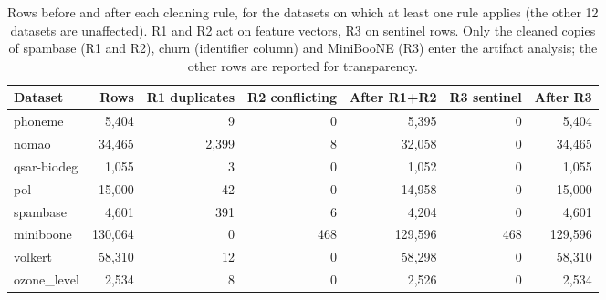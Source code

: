 \begin{table}[htbp]
\centering\small
\caption{Rows before and after each cleaning rule, for the datasets on which at least one rule applies (the other 12 datasets are unaffected). R1 and R2 act on feature vectors, R3 on sentinel rows. Only the cleaned copies of spambase (R1 and R2), churn (identifier column) and MiniBooNE (R3) enter the artifact analysis; the other rows are reported for transparency.}\label{tab:cleaning_counts}
\begin{tabular}{@{}lrrrrrr@{}}
\toprule
Dataset & Rows & R1 duplicates & R2 conflicting & After R1+R2 & R3 sentinel & After R3 \\
\midrule
phoneme & 5{,}404 & 9 & 0 & 5{,}395 & 0 & 5{,}404 \\
nomao & 34{,}465 & 2{,}399 & 8 & 32{,}058 & 0 & 34{,}465 \\
qsar-biodeg & 1{,}055 & 3 & 0 & 1{,}052 & 0 & 1{,}055 \\
pol & 15{,}000 & 42 & 0 & 14{,}958 & 0 & 15{,}000 \\
spambase & 4{,}601 & 391 & 6 & 4{,}204 & 0 & 4{,}601 \\
miniboone & 130{,}064 & 0 & 468 & 129{,}596 & 468 & 129{,}596 \\
volkert & 58{,}310 & 12 & 0 & 58{,}298 & 0 & 58{,}310 \\
ozone\_level & 2{,}534 & 8 & 0 & 2{,}526 & 0 & 2{,}534 \\
\bottomrule
\end{tabular}
\end{table}
